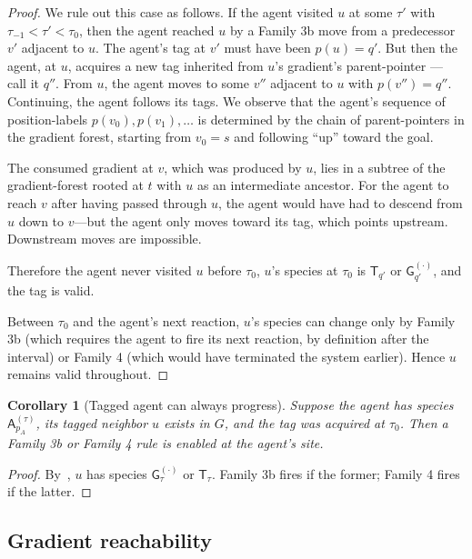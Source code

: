 \documentclass[11pt]{article}
\theoremstyle{plain}
\newtheorem{corollary}[theorem]{Corollary}
\theoremstyle{definition}
\theoremstyle{remark}
\begin{document}
\begin{proof}
We rule out this case as follows. If the agent visited $u$ at some $\tau'$ with $\tau_{-1} < \tau' < \tau_0$, then the agent reached $u$ by a Family 3b move from a predecessor $v'$ adjacent to $u$. The agent's tag at $v'$ must have been $p(u) = q'$. But then the agent, at $u$, acquires a new tag inherited from $u$'s gradient's parent-pointer --- call it $q''$. From $u$, the agent moves to some $v''$ adjacent to $u$ with $p(v'') = q''$. Continuing, the agent follows its tags. We observe that the agent's sequence of position-labels $p(v_0), p(v_1), \ldots$ is determined by the chain of parent-pointers in the gradient forest, starting from $v_0 = s$ and following ``up'' toward the goal.

The consumed gradient at $v$, which was produced by $u$, lies in a subtree of the gradient-forest rooted at $t$ with $u$ as an intermediate ancestor. For the agent to reach $v$ after having passed through $u$, the agent would have had to descend from $u$ down to $v$---but the agent only moves toward its tag, which points upstream. Downstream moves are impossible.

Therefore the agent never visited $u$ before $\tau_0$, $u$'s species at $\tau_0$ is $\mathsf{T}_{q'}$ or $\mathsf{G}^{(\cdot)}_{q'}$, and the tag is valid.

Between $\tau_0$ and the agent's next reaction, $u$'s species can change only by Family 3b (which requires the agent to fire its next reaction, by definition after the interval) or Family 4 (which would have terminated the system earlier). Hence $u$ remains valid throughout.
\end{proof}

\begin{corollary}[Tagged agent can always progress]
\label{cor:progress}
Suppose the agent has species $\mathsf{A}^{(\tau)}_{p_A}$, its tagged neighbor $u$ exists in $G$, and the tag was acquired at $\tau_0$. Then a Family 3b or Family 4 rule is enabled at the agent's site.
\end{corollary}

\begin{proof}
By~, $u$ has species $\mathsf{G}^{(\cdot)}_\tau$ or $\mathsf{T}_\tau$. Family 3b fires if the former; Family 4 fires if the latter.
\end{proof}

\subsection{Gradient reachability}
\end{document}
